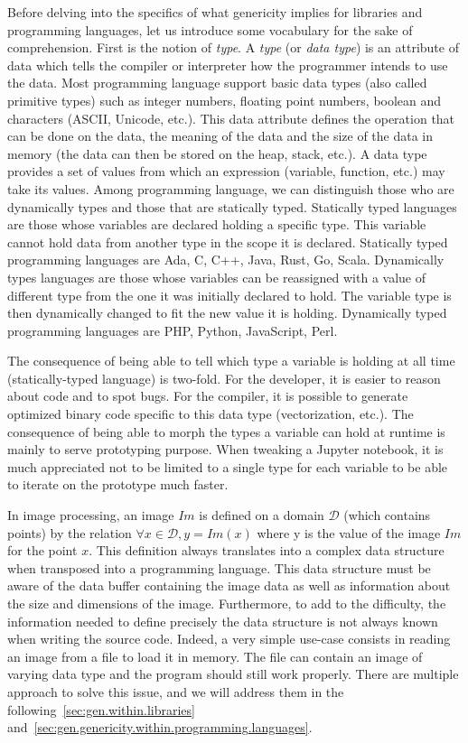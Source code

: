Before delving into the specifics of what genericity implies for libraries and programming languages, let us introduce
some vocabulary for the sake of comprehension. First is the notion of \emph{type}. A \emph{type} (or \emph{data type})
is an attribute of data which tells the compiler or interpreter how the programmer intends to use the data. Most
programming language support basic data types (also called primitive types) such as integer numbers, floating point
numbers, boolean and characters (ASCII, Unicode, etc.). This data attribute defines the operation that can be done on
the data, the meaning of the data and the size of the data in memory (the data can then be stored on the heap, stack,
etc.). A data type provides a set of values from which an expression (\ie variable, function, etc.) may take its
values. Among programming language, we can distinguish those who are dynamically types and those that are statically
typed. Statically typed languages are those whose variables are declared holding a specific type. This variable cannot
hold data from another type in the scope it is declared. Statically typed programming languages are Ada, C, C++, Java,
Rust, Go, Scala. Dynamically types languages are those whose variables can be reassigned with a value of different type
from the one it was initially declared to hold. The variable type is then dynamically changed to fit the new value it is
holding. Dynamically typed programming languages are PHP, Python, JavaScript, Perl.

The consequence of being able to tell which type a variable is holding at all time (statically-typed language) is
two-fold. For the developer, it is easier to reason about code and to spot bugs. For the compiler, it is possible to
generate optimized binary code specific to this data type (vectorization, etc.). The consequence of being able to morph
the types a variable can hold at runtime is mainly to serve prototyping purpose. When tweaking a Jupyter notebook, it is
much appreciated not to be limited to a single type for each variable to be able to iterate on the prototype much
faster.

In image processing, an image \(Im\) is defined on a domain \(\mathcal{D}\) (which contains points) by the relation
\(\forall x \in \mathcal{D}, y = Im(x)\) where y is the value of the image \(Im\) for the point \(x\). This definition
always translates into a complex data structure when transposed into a programming language. This data structure must be
aware of the data buffer containing the image data as well as information about the size and dimensions of the image.
Furthermore, to add to the difficulty, the information needed to define precisely the data structure is not always known
when writing the source code. Indeed, a very simple use-case consists in reading an image from a file to load it in
memory. The file can contain an image of varying data type and the program should still work properly. There are
multiple approach to solve this issue, and we will address them in the following~\cref{sec:gen.within.libraries}
and~\cref{sec:gen.genericity.within.programming.languages}.



